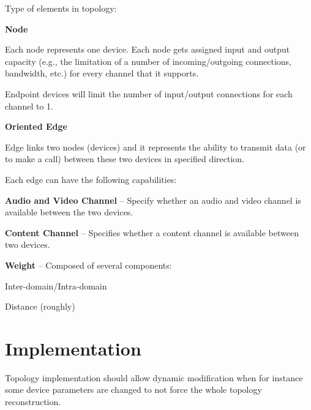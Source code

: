 \documentclass[a4paper]{report}
\begin{document}
Type of elements in topology:
\begin{itemize}

\item{\textbf{Node}} 

Each node represents one device.
Each node gets assigned input and output capacity (e.g., the limitation of 
a number of incoming/outgoing connections, bandwidth, etc.) for every channel
that it supports.

Endpoint devices will limit the number of input/output connections for each
channel to 1.

   

\item{\textbf{Oriented Edge}} 

Edge links two nodes (devices) and it represents the 
ability to transmit data (or to make a call) between these two devices 
in specified direction.
  
Each edge can have the following capabilities:
\begin{compactitem}   
  \item \textbf{Audio and Video Channel} -- Specify whether an audio and video channel is available between the two devices.
      
  \item \textbf{Content Channel} -- Specifies whether a content channel is available between two devices.
    
  \item \textbf{Weight} -- Composed of several components:
  \begin{compactitem}  
    \item Inter-domain/Intra-domain
    \item Distance (roughly)
  \end{compactitem}  
\end{compactitem}   

\end{itemize}
  

\section{Implementation}
Topology implementation should allow dynamic modification when for instance some device parameters are changed to not force the whole topology reconstruction.
\end{document}

